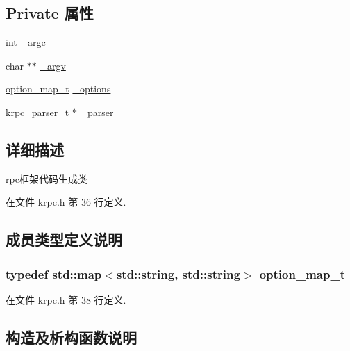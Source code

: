 \subsection*{Private 属性}
\begin{DoxyCompactItemize}
\item 
int \hyperlink{classkrpc__gen__t_a038ff3ebc8f1b3be674bdf24e178140c}{\+\_\+argc}
\item 
char $\ast$$\ast$ \hyperlink{classkrpc__gen__t_aff61fe53bf74f31923195e008ce82193}{\+\_\+argv}
\item 
\hyperlink{classkrpc__gen__t_a196bb243e2043de12bc0b0563c1e0e7c}{option\+\_\+map\+\_\+t} \hyperlink{classkrpc__gen__t_a96849ab73e3d8d5a1537258893161e81}{\+\_\+options}
\item 
\hyperlink{classkrpc__parser__t}{krpc\+\_\+parser\+\_\+t} $\ast$ \hyperlink{classkrpc__gen__t_a36ddbcdd9990ef301e009c81dfb703e3}{\+\_\+parser}
\end{DoxyCompactItemize}


\subsection{详细描述}
rpc框架代码生成类 

在文件 krpc.\+h 第 36 行定义.



\subsection{成员类型定义说明}
\hypertarget{classkrpc__gen__t_a196bb243e2043de12bc0b0563c1e0e7c}{}
\subsubsection[{option\+\_\+map\+\_\+t}]{\setlength{\rightskip}{0pt plus 5cm}typedef std\+::map$<$std\+::string, std\+::string$>$ {\bf option\+\_\+map\+\_\+t}}\label{classkrpc__gen__t_a196bb243e2043de12bc0b0563c1e0e7c}


在文件 krpc.\+h 第 38 行定义.



\subsection{构造及析构函数说明}
\hypertarget{classkrpc__gen__t_a5401a305cb40981a42b3a367cd38528b}{}
